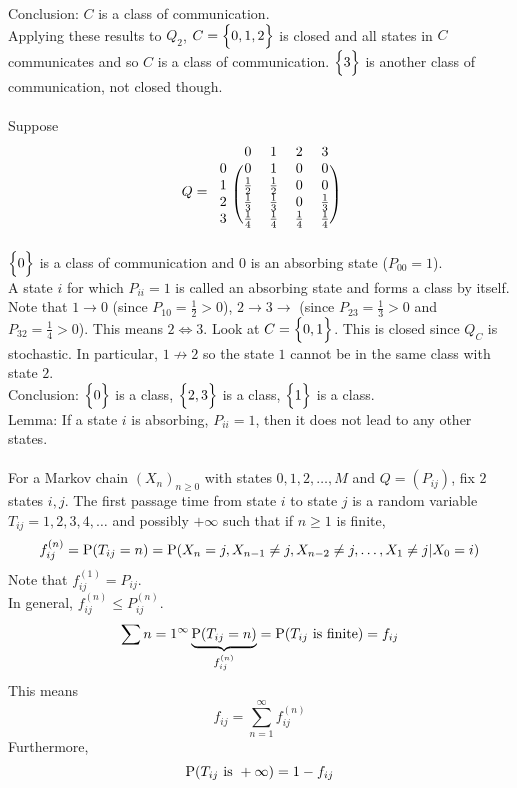 \documentclass[12pt]{article}
\begin{document}
Conclusion: $C$ is a class of communication. \\
Applying these results to $Q_2$, $C = \Big\{ 0,1,2 \Big\}$ is closed and all states in $C$ communicates and so $C$ is a class of communication. $\Big\{ 3 \Big\}$ is another class of communication, not closed though. \\~\\
Suppose $$Q = \begin{blockarray}{ccccc}
&0&1&2&3 \\
\begin{block}{c(cccc)}
0 & 0 & 1 & 0 & 0 \\
1 & \frac{1}{2} & \frac{1}{2} & 0 & 0 \\ 
2 & \frac{1}{3} & \frac{1}{3} & 0 & \frac{1}{3} \\ 
3 & \frac{1}{4} & \frac{1}{4} & \frac{1}{4} & \frac{1}{4} \\ \end{block} \end{blockarray} $$
$\Big\{ 0 \Big\}$ is a class of communication and $0$ is an absorbing state ($P_{00} = 1$). \\
A state $i$ for which $P_{ii} = 1$ is called an absorbing state and forms a class by itself. \\
Note that $1\to 0$ (since $P_{10} = \frac{1}{2} > 0$), $2 \to 3 \to$ (since $P_{23} = \frac{1}{3} > 0$ and $P_{32} = \frac{1}{4} > 0$). This means $2 \iff 3$. Look at $C = \Big\{ 0,1 \Big\}$. This is closed since $Q_C$ is stochastic. In particular, $1 \not\to 2$ so the state $1$ cannot be in the same class with state $2$. \\
Conclusion: $\Big\{ 0 \Big\}$ is a class, $\Big\{ 2,3 \Big\}$ is a class, $\Big\{ 1 \Big\}$ is a class. \\
Lemma: If a state $i$ is absorbing, $P_{ii} = 1$, then it does not lead to any other states. \\~\\
For a Markov chain $(X_n)_{n \geq 0}$ with states $0,1,2,\dots, M$ and $Q = (P_{ij})$, fix $2$ states $i,j$. The first passage time from state $i$ to state $j$ is a random variable $T_{ij} = 1,2,3,4,\dots$ and possibly $+\infty$ such that if $n\geq 1$ is finite, $$f_{ij}^{(n)} = \mathrm{P}( T_{ij} = n ) = \mathrm{P}( X_n = j, X_{n-1} \neq j, X_{n-2} \neq j, \dots, X_1 \neq j | X_0 = i )$$
Note that $f_{ij}^{(1)} = P_{ij}$. \\
In general, $f_{ij}^{(n)} \leq P_{ij}^{(n)}$. 
$$ \sum{n=1}^\infty \underbrace{\mathrm{P}( T_{ij} = n )}_{f_{ij}^{(n)}} = \mathrm{P}( T_{ij} \text{ is finite} ) = f_{ij} $$ This means $$f_{ij} = \sum_{n=1}^\infty f_{ij}^{(n)} $$ Furthermore, $$\mathrm{P}( T_{ij} \text{ is } + \infty ) = 1 - f_{ij} $$ 
\end{document}
